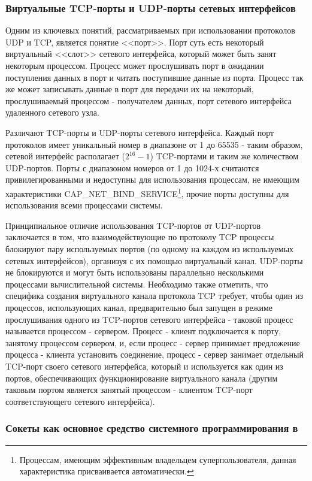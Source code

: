 \subsubsection{Виртуальные TCP-порты и UDP-порты сетевых интерфейсов}

	Одним из ключевых понятий, рассматриваемых при использовании протоколов UDP и TCP, является понятие <<порт>>.
	Порт суть есть некоторый виртуальный <<слот>> сетевого интерфейса, который может быть занят некоторым процессом.
	Процесс может прослушивать порт в ожидании поступления данных в порт и читать поступившие данные из порта.
	Процесс так же может записывать данные в порт для передачи их на некоторый, прослушиваемый процессом - получателем
	данных, порт сетевого интерфейса удаленного сетевого узла.

	Различают TCP-порты и UDP-порты сетевого интерфейса. Каждый порт протоколов имеет уникальный номер
	в диапазоне от 1 до 65535 - таким образом, сетевой интерфейс располагает ($2^{16} - 1$) TCP-портами и таким же
	количеством UDP-портов. Порты с диапазоном номеров от 1 до 1024-х считаются привилегированными
	и недоступны для использования процессам, не имеющим характеристики CAP\_NET\_BIND\_SERVICE\footnote{Процессам,
	имеющим эффективным владельцем суперпользователя, данная характеристика присваивается автоматически.},
	прочие порты доступны для использования всеми процессами системы.

	Принципиальное отличие использования TCP-портов от UDP-портов заключается в том, что взаимодействующие
	по протоколу TCP процессы блокируют пару используемых портов (по одному на каждом из используемых сетевых
	интерфейсов), организуя с их помощью виртуальный канал. UDP-порты не блокируются и могут быть использованы
	параллельно несколькими процессами вычислительной системы. Необходимо также отметить, что специфика создания
	виртуального канала протокола TCP требует, чтобы один из процессов, использующих канал, предварительно был запущен
	в режиме прослушивания одного из TCP-портов сетевого интерфейса - таковой процесс называется процессом - сервером.
	Процесс - клиент подключается к порту, занятому процессом сервером, и, если процесс - сервер
	принимает предложение процесса - клиента установить соединение, процесс - сервер занимает отдельный TCP-порт
	своего сетевого интерфейса, который и используется как один из портов, обеспечивающих функционирование
	виртуального канала (другим таковым портом является занятый процессом - клиентом TCP-порт соответствующего
	сетевого интерфейса).

\subsubsection{Сокеты как основное средство системного программирования в \linux}

